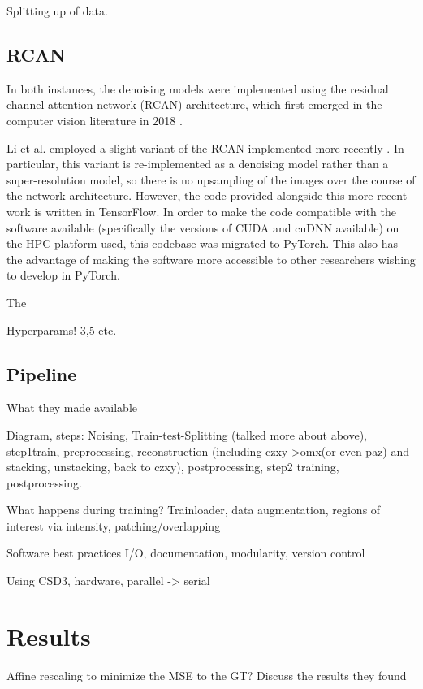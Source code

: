 \documentclass[12pt]{article}
\begin{document}
Splitting up of data.

\subsection{RCAN}

In both instances, the denoising models were implemented using the residual channel attention network (RCAN) architecture,
which first emerged in the computer vision literature in 2018 \cite{rcan2018}.

Li et al. employed a slight variant of the RCAN implemented more recently \cite{rcan2021}.
In particular, this variant is re-implemented as a denoising model rather than a super-resolution model,
so there is no upsampling of the images over the course of the network architecture.
However, the code provided alongside this more recent work is written in TensorFlow.
In order to make the code compatible with the software available (specifically the versions of CUDA and cuDNN available) on the HPC platform used,
this codebase was migrated to PyTorch.
This also has the advantage of making the software more accessible to other researchers wishing to develop in PyTorch.

The

Hyperparams! 3,5 etc.


\subsection{Pipeline}

What they made available

Diagram, steps:
Noising, Train-test-Splitting (talked more about above), step1train, preprocessing, reconstruction (including czxy->omx(or even paz) and stacking, unstacking, back to czxy),
postprocessing, step2 training, postprocessing.

What happens during training? Trainloader, data augmentation, regions of interest via intensity,
patching/overlapping

Software best practices
I/O, documentation, modularity, version control

Using CSD3, hardware, parallel -> serial

\section{Results}

Affine rescaling to minimize the MSE to the GT?
Discuss the results they found
\end{document}
